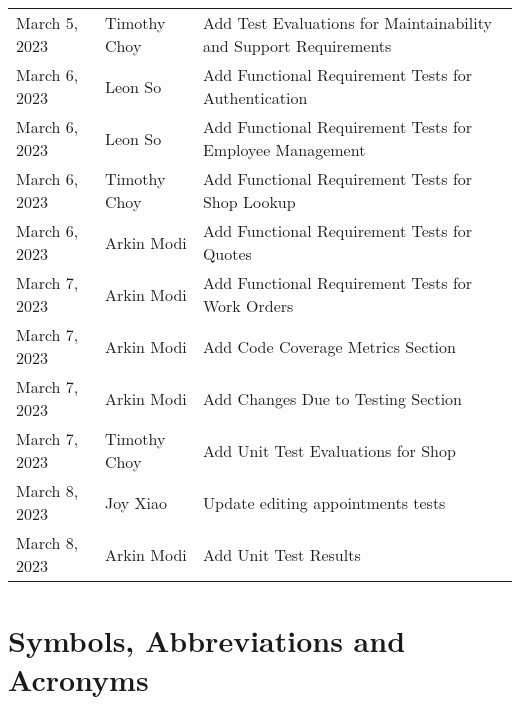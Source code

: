 \documentclass[12pt, titlepage]{article}
\begin{document}
\begin{table}[hp]
\begin{tabularx}{\textwidth}{llX}
		March 5, 2023     & Timothy Choy          & Add Test Evaluations for Maintainability and Support Requirements \\
		March 6, 2023     & Leon So               & Add Functional Requirement Tests for Authentication               \\
		March 6, 2023     & Leon So               & Add Functional Requirement Tests for Employee Management          \\
		March 6, 2023     & Timothy Choy          & Add Functional Requirement Tests for Shop Lookup                  \\
		March 6, 2023     & Arkin Modi            & Add Functional Requirement Tests for Quotes                       \\
		March 7, 2023     & Arkin Modi            & Add Functional Requirement Tests for Work Orders                  \\
		March 7, 2023     & Arkin Modi            & Add Code Coverage Metrics Section                                 \\
		March 7, 2023     & Arkin Modi            & Add Changes Due to Testing Section                                \\
		March 7, 2023     & Timothy Choy          & Add Unit Test Evaluations for Shop                                \\
		March 8, 2023     & Joy Xiao              & Update editing appointments tests                                 \\
		March 8, 2023     & Arkin Modi            & Add Unit Test Results                                             \\
		\bottomrule
	\end{tabularx}
\end{table}
\newpage

\section{Symbols, Abbreviations and Acronyms}
\end{document}
